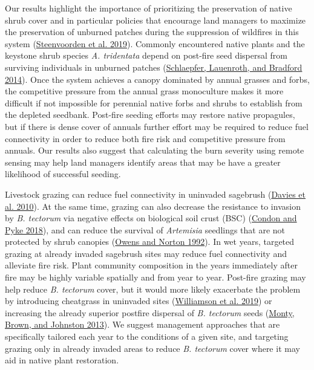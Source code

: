 \documentclass[
  12pt,
]{article}
\begin{document}
Our results highlight the importance of prioritizing the preservation of
native shrub cover and in particular policies that encourage land
managers to maximize the preservation of unburned patches during the
suppression of wildfires in this system
(\protect\hyperlink{ref-Steenvoorden2019}{Steenvoorden et al. 2019}).
Commonly encountered native plants and the keystone shrub species
\emph{A. tridentata} depend on post-fire seed dispersal from surviving
individuals in unburned patches
(\protect\hyperlink{ref-Schlaepfer2014}{Schlaepfer, Lauenroth, and
Bradford 2014}). Once the system achieves a canopy dominated by annual
grasses and forbs, the competitive pressure from the annual grass
monoculture makes it more difficult if not impossible for perennial
native forbs and shrubs to establish from the depleted seedbank.
Post-fire seeding efforts may restore native propagules, but if there is
dense cover of annuals further effort may be required to reduce fuel
connectivity in order to reduce both fire risk and competitive pressure
from annuals. Our results also suggest that calculating the burn
severity using remote sensing may help land managers identify areas that
may be have a greater likelihood of successful seeding.

Livestock grazing can reduce fuel connectivity in uninvaded sagebrush
(\protect\hyperlink{ref-Davies2010}{Davies et al. 2010}). At the same
time, grazing can also decrease the resistance to invasion by \emph{B.
tectorum} via negative effects on biological soil crust (BSC)
(\protect\hyperlink{ref-Condon2018}{Condon and Pyke 2018}), and can
reduce the survival of \emph{Artemisia} seedlings that are not protected
by shrub canopies (\protect\hyperlink{ref-Owens1992}{Owens and Norton
1992}). In wet years, targeted grazing at already invaded sagebrush
sites may reduce fuel connectivity and alleviate fire risk. Plant
community composition in the years immediately after fire may be highly
variable spatially and from year to year. Post-fire grazing may help
reduce \emph{B. tectorum} cover, but it would more likely exacerbate the
problem by introducing cheatgrass in uninvaded sites
(\protect\hyperlink{ref-Williamson2019}{Williamson et al. 2019}) or
increasing the already superior postfire dispersal of \emph{B. tectorum}
seeds (\protect\hyperlink{ref-Monty2013}{Monty, Brown, and Johnston
2013}). We suggest management approaches that are specifically tailored
each year to the conditions of a given site, and targeting grazing only
in already invaded areas to reduce \emph{B. tectorum} cover where it may
aid in native plant restoration.
\end{document}
